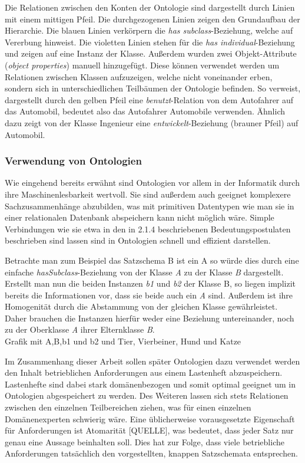 \documentclass[12pt]{report}
\begin{document}
Die Relationen zwischen den Konten der Ontologie sind dargestellt durch Linien mit einem mittigen Pfeil. Die durchgezogenen Linien zeigen den Grundaufbau der Hierarchie. Die blauen Linien verkörpern die \textit{has subclass}-Beziehung, welche auf Vererbung hinweist. Die violetten Linien stehen für die \textit{has individual}-Beziehung und zeigen auf eine Instanz der Klasse. 
Außerdem wurden zwei Objekt-Attribute (\textit{object properties}) manuell hinzugefügt. Diese können verwendet werden um Relationen zwischen Klassen aufzuzeigen, welche nicht voneinander erben, sondern sich in unterschiedlichen \glqq Teilbäumen\grqq{} der Ontologie befinden. So verweist, dargestellt durch den gelben Pfeil eine \textit{benutzt}-Relation von dem Autofahrer auf das Automobil, bedeutet also das Autofahrer Automobile verwenden.  
Ähnlich dazu zeigt von der Klasse Ingenieur eine \textit{entwickelt}-Beziehung (brauner Pfeil) auf Automobil.

\subsubsection{Verwendung von Ontologien}
Wie eingehend bereits erwähnt sind Ontologien vor allem in der Informatik durch ihre Maschinenlesbarkeit wertvoll. Sie sind außerdem auch geeignet komplexere Sachzusammenhänge abzubilden, was mit primitiven Datentypen wie man sie in einer relationalen Datenbank abspeichern kann nicht möglich wäre. Simple Verbindungen wie sie etwa in den in 2.1.4 beschriebenen Bedeutungspostulaten beschrieben sind lassen sind in Ontologien schnell und effizient darstellen.

Betrachte man zum Beispiel das Satzschema \glqq B ist ein A\grqq{} so würde dies durch eine einfache \textit{hasSubclass}-Beziehung von der Klasse \textit{A} zu der Klasse \textit{B} dargestellt.
Erstellt man nun die beiden Instanzen \textit{b1} und \textit{b2} der Klasse B, so liegen implizit bereits die Informationen vor, dass sie beide auch ein \textit{A} sind. Außerdem ist ihre Homogenität durch die Abstammung von der gleichen Klasse gewährleistet. Daher brauchen die Instanzen hierfür weder eine Beziehung untereinander, noch zu der Oberklasse \textit{A} ihrer Elternklasse \textit{B}.
\\
\newline
Grafik mit A,B,b1 und b2 und Tier, Vierbeiner, Hund und Katze
\\
\newline

Im Zusammenhang dieser Arbeit sollen später Ontologien dazu verwendet werden den Inhalt betrieblichen Anforderungen aus einem Lastenheft abzuspeichern. Lastenhefte sind dabei stark domänenbezogen und somit optimal geeignet um in Ontologien abgespeichert zu werden. Des Weiteren lassen sich stets Relationen zwischen den einzelnen Teilbereichen ziehen, was für einen einzelnen Domänenexperten schwierig wäre. Eine üblicherweise vorausgesetzte Eigenschaft für Anforderungen ist Atomarität [QUELLE], was bedeutet, dass jeder Satz nur genau eine Aussage beinhalten soll. Dies hat zur Folge, dass viele betriebliche Anforderungen tatsächlich den vorgestellten, knappen Satzschemata entsprechen.
\end{document}
